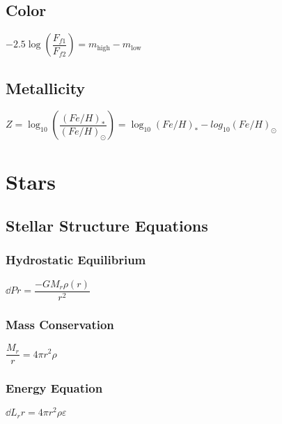 \subsection{Color}			
\begin{itemize}
\itemt \( -2.5\log\left(\dfrac{F_{f1}}{F_{f2}}\right) = m_\mathrm{high} - m_\mathrm{low}\)
\end{itemize}			

\subsection{Metallicity}		
\begin{itemize}
\itemt \( Z = \log_{10}\left(\dfrac{(Fe/H)_*}{(Fe/H)_\odot}\right) = \log_{10}(Fe/H)_* - log_{10}(Fe/H)_\odot \)
\end{itemize}





	\section{Stars}


\subsection{Stellar Structure Equations}

\subsubsection{Hydrostatic Equilibrium}
\begin{itemize}
\itemt \( \dd{P}{r} = \dfrac{-G M_r \rho(r)}{r^2} \)
\end{itemize}

\subsubsection{Mass Conservation}
\begin{itemize}
\itemt \( \dfrac{M_r}{r} = 4 \pi r^2 \rho \)
\end{itemize}

\subsubsection{Energy Equation}
\begin{itemize}
\itemt \( \dd{L_r}{r} = 4 \pi r^2 \rho \varepsilon \)
\end{itemize}

